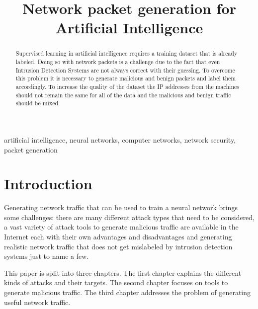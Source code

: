 \documentclass[conference]{IEEEtran}
\begin{document}
\title{Network packet generation for Artificial Intelligence\\
}

\author{
\and
{}
}

\maketitle

\begin{abstract}
Supervised learning in artificial intelligence requires a training dataset that is already labeled. Doing so with network packets is a challenge due to the fact that even Intrusion Detection Systems are not always correct with their guessing. To overcome this problem it is necessary to generate malicious and benign packets and label them accordingly. To increase the quality of the dataset the IP addresses from the machines should not remain the same for all of the data and the malicious and benign traffic should be mixed.

\end{abstract}

\begin{IEEEkeywords}
artificial intelligence, neural networks, computer networks, network security, packet generation
\end{IEEEkeywords}

\section{Introduction}
Generating network traffic that can be used to train a neural network brings some challenges: there are many different attack types that need to be considered, a vast variety of attack tools to generate malicious traffic are available in the Internet each with their own advantages and disadvantages and generating realistic network traffic that does not get mislabeled by intrusion detection systems just to name a few. 

This paper is split into three chapters. The first chapter explains the different kinds of attacks and their targets. The second chapter focuses on tools to generate malicious traffic. The third chapter addresses the problem of generating useful network traffic.
\end{document}
